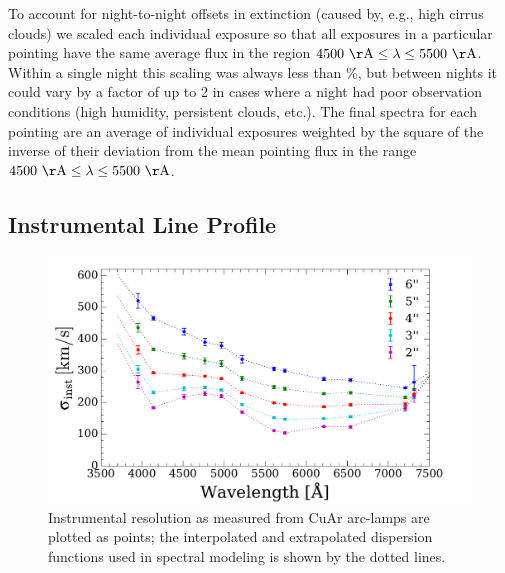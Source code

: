 
To account for night-to-night offsets in extinction (caused by, e.g.,
high cirrus clouds) we scaled each individual exposure so that all
exposures in a particular pointing have the same average flux in the
region $\val{4500}{\AA} \leq \lambda \leq \val{5500}{\AA}$. Within a
single night this scaling was always less than \%, but between
nights it could vary by a factor of up to 2 in cases where a night had
poor observation conditions (high humidity, persistent clouds,
etc.). The final spectra for each pointing are an average of
individual exposures weighted by the square of the inverse of their
deviation from the mean pointing flux in the range $\val{4500}{\AA}
\leq \lambda \leq \val{5500}{\AA}$.

\subsection{Instrumental Line Profile}
\label{891_1:sec:GPak_dispersion}
\begin{figure}
  \centering
  \includegraphics[width=\columnwidth]{891_1/figs/disp_paper.pdf}

  \caption[Variation of instrumental resolution in \GP
  fibers]{\label{891_1:fig:dispfunc}\fixspacing Instrumental
    resolution as measured from CuAr arc-lamps are plotted as points;
    the interpolated and extrapolated dispersion functions used in
    spectral modeling is shown by the dotted lines.}
\end{figure}

